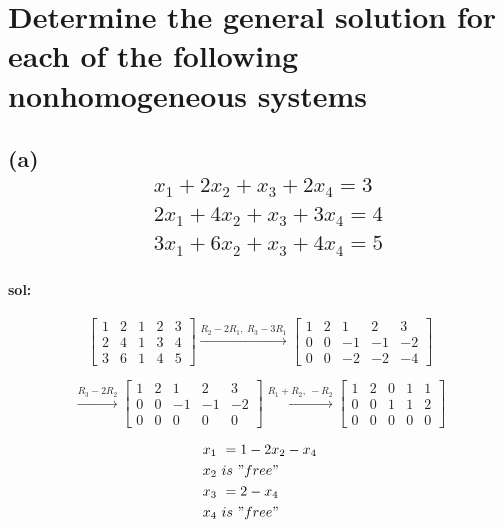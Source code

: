 \documentclass{article}
\begin{document}
	\section{Determine the general solution for each of the following nonhomogeneous systems}
	\subsection*{(a)		
		\begin{align*}
			&x_1+2x_2+x_3+2x_4=3\\	
			&2x_1+4x_2+x_3+3x_4=4\\	&3x_1+6x_2+x_3+4x_4=5
		\end{align*}
	}
		
	\paragraph{sol:}
	\[
	\left[
		\begin{array}{cccc|c}
			1 & 2 & 1 & 2 & 3\\
			2 & 4 & 1 & 3 & 4\\
			3 & 6 & 1 & 4 & 5
		\end{array}
	\right]
	\xrightarrow{R_2-2R_1,\ R_3-3R_1}
	\left[
		\begin{array}{cccc|c}
			1 & 2 & 1 & 2 & 3\\
			0 & 0 & -1 & -1 & -2\\
			0 & 0 & -2 & -2 & -4
		\end{array}
	\right]	
	\]
	
	\[
	\xrightarrow{R_3-2R_2}
	\left[
		\begin{array}{cccc|c}
			1 & 2 & 1 & 2 & 3\\
			0 & 0 & -1 & -1 & -2\\
			0 & 0 & 0 & 0 & 0
		\end{array}
	\right]
	\xrightarrow{R_1+R_2,\ -R_2}
	\left[
		\begin{array}{cccc|c}
			1 & 2 & 0 & 1 & 1\\
			0 & 0 & 1 & 1 & 2\\
			0 & 0 & 0 & 0 & 0
		\end{array}
	\right]
	\]
	
	\begin{align*}
	x_1\ &= 1-2x_2-x_4\\
	x_2\ &is \ "free"\\
	x_3\ &= 2-x_4\\
	x_4\ &is \ "free"
	\end{align*}
	
\end{document}
